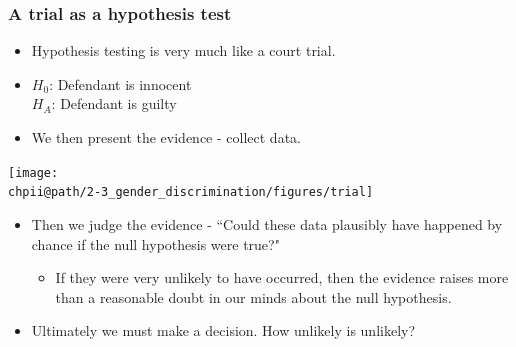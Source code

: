 \documentclass[slidestop,compress,mathserif]{beamer}
\makeatletter
\def\chpii@path{../../Chp 2}
\makeatother
\begin{document}
\begin{frame}
\frametitle{A trial as a hypothesis test}

{
\begin{itemize}

\item Hypothesis testing is very much like a court trial.

\item $H_0$: Defendant is innocent \\
$H_A$: Defendant is guilty

\item We then present the evidence - collect data.

\end{itemize}
}
{
\texttt{[image: \\chpii@path/2-3\_gender\_discrimination/figures/trial]}
}

\begin{itemize}

\item Then we judge the evidence - ``Could these data plausibly have happened by chance if the null hypothesis were true?"
\begin{itemize}
\item If they were very unlikely to have occurred, then the evidence raises more than a reasonable doubt in our minds about the null hypothesis.
\end{itemize}

\item Ultimately we must make a decision. How unlikely is unlikely?

\end{itemize}


\end{frame}

\end{document}
